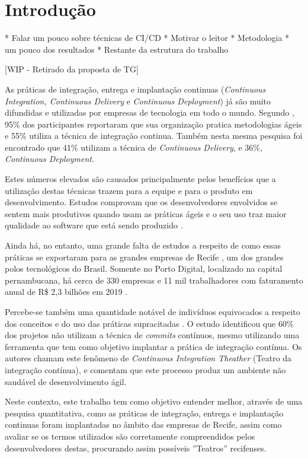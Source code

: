
\chapter{Introdução}

* Falar um pouco sobre técnicas de CI/CD
* Motivar o leitor
* Metodologia
* um pouco dos resultados
* Restante da estrutura do trabalho

[WIP - Retirado da proposta de TG]

As práticas de integração, entrega e implantação continuas (\emph{Continuous Integration, Continuous Delivery} e \emph{Continuous Deployment}) já são muito difundidas e utilizadas por empresas de tecnologia em todo o mundo. Segundo \cite{stateAgileReport2020}, 95\% dos participantes reportaram que sua organização pratica metodologias ágeis e 55\% utiliza a técnica de integração continua. Também nesta mesma pesquisa foi encontrado que 41\% utilizam a técnica de \emph{Continuous Delivery}, e 36\%, \emph{Continuous Deployment}.

Estes números elevados são causados principalmente pelos benefícios que a utilização destas técnicas trazem para a equipe e para o produto em desenvolvimento. Estudos comprovam que os desenvolvedores envolvidos se sentem mais produtivos quando usam as práticas ágeis \cite{hilton2016} e o seu uso traz maior qualidade ao software que está sendo produzido \cite{savor2015}. 

Ainda há, no entanto, uma grande falta de estudos a respeito de como essas práticas se exportaram para as grandes empresas de Recife \cite{empiricalStudy2016}, um dos grandes polos tecnológicos do Brasil. Somente no Porto Digital, localizado na capital pernambucana, há cerca de 330 empresas e 11 mil trabalhadores com faturamento anual de R\$ 2,3 bilhões em 2019 \cite{portoDigital}.

Percebe-se também uma quantidade notável de indivíduos equivocados a respeito dos conceitos e do uso das práticas supracitadas \cite{debbiche2014challenges}. O estudo \cite{citheater2019} identificou que 60\% dos projetos não utilizam a técnica de \emph{commits} contínuos, mesmo utilizando uma ferramenta que tem como objetivo implantar a prática de integração contínua. Os autores chamam este fenômeno de \emph{Continuous Integration Theather} (Teatro da integração contínua), e comentam que este processo produz um ambiente não saudável de desenvolvimento ágil.

Neste contexto, este trabalho tem como objetivo entender melhor, através de uma pesquisa quantitativa, como as práticas de integração, entrega e implantação continuas foram implantadas no âmbito das empresas de Recife, assim como avaliar se os termos utilizados são corretamente compreendidos pelos desenvolvedores destas, procurando assim possíveis ''Teatros'' recifenses. 

